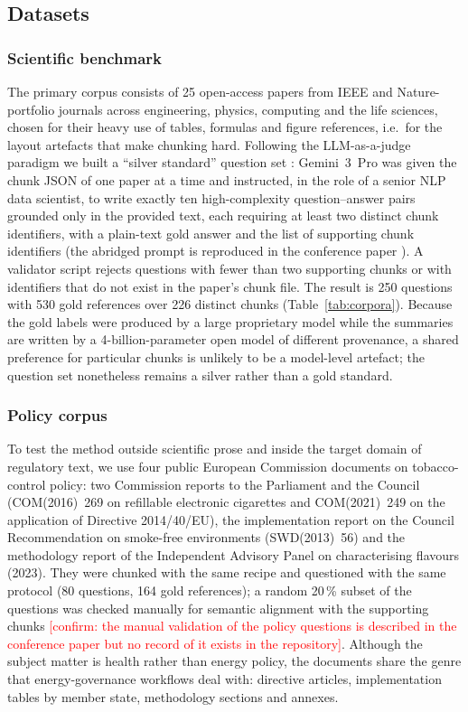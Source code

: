 \documentclass[pdflatex,sn-mathphys-num]{sn-jnl}
\newcommand{\todo}[1]{\textcolor{red}{#1}}
\theoremstyle{thmstyleone}%
\theoremstyle{thmstylethree}%
\begin{document}
\subsection{Datasets}\label{sec:datasets}

\subsubsection{Scientific benchmark}
The primary corpus consists of 25 open-access papers from IEEE and Nature-portfolio journals across engineering, physics, computing and the life sciences, chosen for their heavy use of tables, formulas and figure references, i.e.\ for the layout artefacts that make chunking hard. Following the LLM-as-a-judge paradigm \cite{zheng2023judgingllmasajudgemtbenchchatbot} we built a ``silver standard'' question set \cite{rebholz2010silverstandard}: Gemini~3~Pro was given the chunk JSON of one paper at a time and instructed, in the role of a senior NLP data scientist, to write exactly ten high-complexity question--answer pairs grounded only in the provided text, each requiring at least two distinct chunk identifiers, with a plain-text gold answer and the list of supporting chunk identifiers (the abridged prompt is reproduced in the conference paper \cite{sandor2025documentslicecontextualretrieval}). A validator script rejects questions with fewer than two supporting chunks or with identifiers that do not exist in the paper's chunk file. The result is 250 questions with 530 gold references over 226 distinct chunks (Table~\ref{tab:corpora}). Because the gold labels were produced by a large proprietary model while the summaries are written by a 4-billion-parameter open model of different provenance, a shared preference for particular chunks is unlikely to be a model-level artefact; the question set nonetheless remains a silver rather than a gold standard.

\subsubsection{Policy corpus}
To test the method outside scientific prose and inside the target domain of regulatory text, we use four public European Commission documents on tobacco-control policy: two Commission reports to the Parliament and the Council (COM(2016)~269 on refillable electronic cigarettes and COM(2021)~249 on the application of Directive 2014/40/EU), the implementation report on the Council Recommendation on smoke-free environments (SWD(2013)~56) and the methodology report of the Independent Advisory Panel on characterising flavours (2023). They were chunked with the same recipe and questioned with the same protocol (80 questions, 164 gold references); a random 20\,\% subset of the questions was checked manually for semantic alignment with the supporting chunks \todo{[confirm: the manual validation of the policy questions is described in the conference paper but no record of it exists in the repository]}. Although the subject matter is health rather than energy policy, the documents share the genre that energy-governance workflows deal with: directive articles, implementation tables by member state, methodology sections and annexes.
\end{document}
